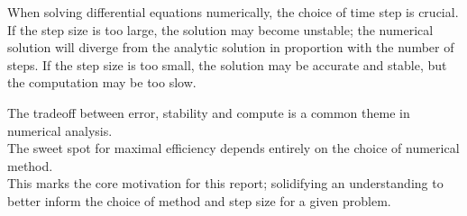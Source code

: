 \par When solving differential equations numerically, the choice of time step is crucial.
If the step size is too large, the solution may become unstable; the numerical solution will diverge from the analytic solution in proportion with the number of steps.
If the step size is too small, the solution may be accurate and stable, but the computation may be too slow.

\par The tradeoff between error, stability and compute is a common theme in numerical analysis.\\
The sweet spot for maximal efficiency depends entirely on the choice of numerical method.\\
This marks the core motivation for this report; solidifying an understanding to better inform the choice of method and step size for a given problem.



